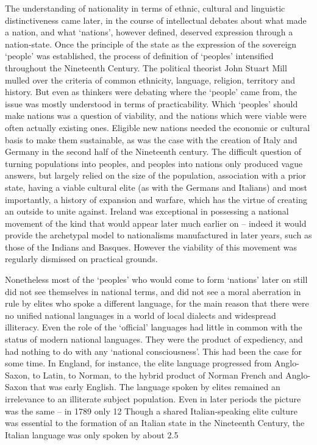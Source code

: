 The understanding of nationality in terms of ethnic, cultural and linguistic distinctiveness came later, in the course of intellectual debates about what made a nation, and what ‘nations’, however defined, deserved expression through a nation-state.
Once the principle of the state as the expression of the sovereign ‘people’ was established, the process of definition of ‘peoples’ intensified throughout the Nineteenth Century.
The political theorist John Stuart Mill mulled over the criteria of common ethnicity, language, religion, territory and history.
But even as thinkers were debating where the ‘people’ came from, the issue was mostly understood in terms of practicability.
Which ‘peoples’ should make nations was a question of viability, and the nations which were viable were often actually existing ones.
Eligible new nations needed the economic or cultural basis to make them sustainable, as was the case with the creation of Italy and Germany in the second half of the Nineteenth century.
The difficult question of turning populations into peoples, and peoples into nations only produced vague answers, but largely relied on the size of the population, association with a prior state, having a viable cultural elite (as with the Germans and Italians) and most importantly, a history of expansion and warfare, which has the virtue of creating an outside to unite against.
Ireland was exceptional in possessing a national movement of the kind that would appear later much earlier on – indeed it would provide the archetypal model to nationalisms manufactured in later years, such as those of the Indians and Basques.
However the viability of this movement was regularly dismissed on practical grounds.

Nonetheless most of the ‘peoples’ who would come to form ‘nations’ later on still did not see themselves in national terms, and did not see a moral aberration in rule by elites who spoke a different language, for the main reason that there were no unified national languages in a world of local dialects and widespread illiteracy.
Even the role of the ‘official’ languages had little in common with the status of modern national languages.
They were the product of expediency, and had nothing to do with any ‘national consciousness’.
This had been the case for some time.
In England, for instance, the elite language progressed from Anglo-Saxon, to Latin, to Norman, to the hybrid product of Norman French and Anglo-Saxon that was early English.
The language spoken by elites remained an irrelevance to an illiterate subject population.
Even in later periods the picture was the same – in 1789 only 12%
Though a shared Italian-speaking elite culture was essential to the formation of an Italian state in the Nineteenth Century, the Italian language was only spoken by about 2.5%

